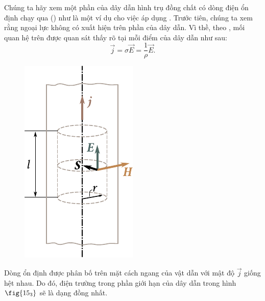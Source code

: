 Chúng ta hãy xem một phần của dây dẫn hình trụ đồng chất có dòng điện ổn định chạy qua () như là một ví dụ cho việc áp dụng .
Trước tiên, chúng ta xem rằng ngoại lực không có xuất hiện trên phần của dây dẫn.
Vì thề, theo , mối quan hệ trên được quan sát thấy rõ tại mỗi điểm của dây dẫn như sau:
\begin{equation*}
    \vec{j} = \sigma \vec{E} = \frac{1}{\rho} \vec{E}.
\end{equation*}

\begin{figure}[!htb]
	\begin{center}
		\includegraphics[scale=1]{figures/ch_15/fig_15_3.pdf}
		\caption[]{}
		\label{fig:15_3}
	\end{center}
	\vspace{-0.8cm}
\end{figure}


Dòng ổn định được phân bố trên mặt cách ngang của vật dẫn với mật độ $\vec{j}$ giống hệt nhau.
Do đó, điện trường trong phần giới hạn của dây dẫn trong hình $\fig{15_3}$ sẽ là dạng đồng nhất.



